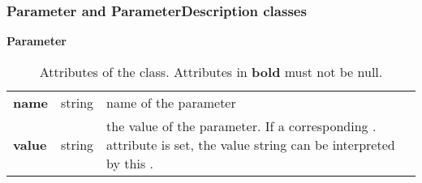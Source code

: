 \subsubsection{Parameter and ParameterDescription classes}
\label{sec:parameterandD}


\begin{table}[ht]
\small
{}\textwidth
 \textbf{\normalsize Parameter}\vspace{0.25em}\\
 \begin{tabulary}{1.0\textwidth}{llL}
 \toprule
  &    & \\
 \midrule
\textbf{name}  & string & name of the parameter \\
\textbf{value} & string & the value of the parameter. If a corresponding . attribute is set, the value string can be interpreted by this . \\
\bottomrule
\end{tabulary}
\caption[Attributes of the  class]{Attributes of the  class. Attributes in \textbf{bold} must not be null.}
\label{tab:param}
\end{table}

